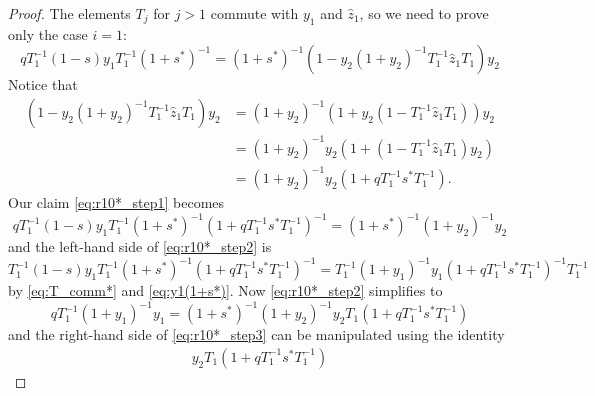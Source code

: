 \documentclass[reqno]{amsart}
\theoremstyle{plain}
\theoremstyle{definition}
\theoremstyle{remark}
\newcommand{\z}{\widehat{z}}
\newcommand{\<}{\langle}
\renewcommand{\>}{\rangle}
\begin{document}
\begin{proof}
    The elements $T_j$ for $j>1$ commute with $y_1$ and $\z_1$, so we need to prove only the case $i=1$:
    \begin{equation}
        \label{eq:r10*_step1}
        qT^{-1}_1 (1-s) y_1 T^{-1}_1 (1+s^*)^{-1} = (1+s^*)^{-1}  \left(1 - y_2 (1 + y_2)^{-1} T_1^{-1} \z_1 T_1 \right) y_2
    \end{equation} 
    Notice that
    \begin{align*}
        \left( 1 - y_2 (1 + y_2)^{-1} T_1^{-1} \z_1 T_1 \right) y_2 
        &= (1 + y_2)^{-1} \left( 1 + y_2 \left( 1 - T_1^{-1} \z_1 T_1 \right) \right)  y_2 \\
        &= (1 + y_2)^{-1} y_2 \left( 1 + \left( 1 - T_1^{-1} \z_1 T_1 \right) y_2 \right)  \\
        &= (1 + y_2)^{-1} y_2 \left( 1 + qT_1^{-1} s^* T_1^{-1} \right). 
    \end{align*}
    Our claim \eqref{eq:r10*_step1} becomes
    \begin{equation}
        \label{eq:r10*_step2}
        qT^{-1}_1 (1-s) y_1 T^{-1}_1 (1+s^*)^{-1} \left( 1 + qT_1^{-1} s^* T_1^{-1} \right)^{-1} = (1+s^*)^{-1}  (1 + y_2)^{-1} y_2
    \end{equation} 
    and the left-hand side of \eqref{eq:r10*_step2} is
    \[ T^{-1}_1 (1-s) y_1 T^{-1}_1 (1+s^*)^{-1} \left( 1 + qT_1^{-1} s^* T_1^{-1} \right)^{-1} = T_1^{-1} (1 + y_1)^{-1} y_1 \left( 1 + qT_1^{-1} s^* T_1^{-1} \right)^{-1} T^{-1}_1 \]
    by \eqref{eq:T_comm*} and \eqref{eq:y1(1+s*)}.
    Now \eqref{eq:r10*_step2} simplifies to
    \begin{equation}
        \label{eq:r10*_step3}
        qT_1^{-1} (1 + y_1)^{-1} y_1 = (1+s^*)^{-1} (1 + y_2)^{-1} y_2 T_1 \left( 1 + qT_1^{-1} s^* T_1^{-1} \right)
    \end{equation}
    and the right-hand side of \eqref{eq:r10*_step3} can be manipulated using the identity
    \begin{align*}
        y_2 T_1 \left( 1 + qT_1^{-1} s^* T_1^{-1} \right) 

\end{align*}
\end{proof}
\end{document}
